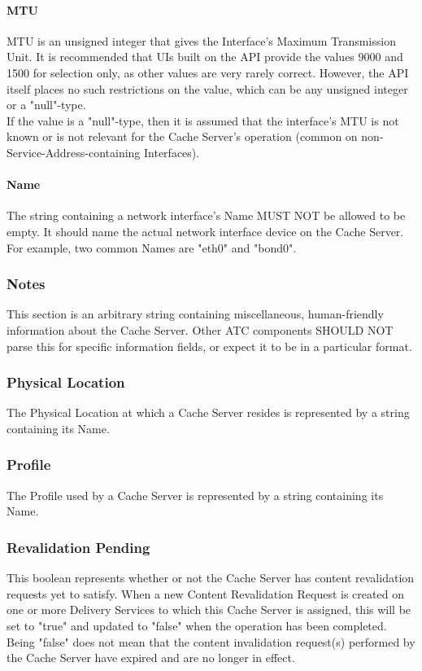 \paragraph{MTU}
MTU is an unsigned integer that gives the Interface's Maximum Transmission
Unit. It is recommended that UIs built on the API provide the values 9000
and 1500 for selection only, as other values are very rarely correct. However,
the API itself places no such restrictions on the value, which can be any
unsigned integer or a "null"-type.\\
If the value is a "null"-type, then it is assumed that the interface's MTU is
not known or is not relevant for the Cache Server's operation (common on
non-Service-Address-containing Interfaces).

\paragraph{Name}
The string containing a network interface's Name MUST NOT be allowed to be
empty. It should name the actual network interface device on the Cache Server.
For example, two common Names are "eth0" and "bond0".

\subsubsection{Notes}
This section is an arbitrary string containing miscellaneous, human-friendly
information about the Cache Server. Other ATC components SHOULD NOT parse this
for specific information fields, or expect it to be in a particular format.

\subsubsection{Physical Location}
The Physical Location at which a Cache Server resides is represented by a string
containing its Name.

\subsubsection{Profile}
The Profile used by a Cache Server is represented by a string containing its
Name.

\subsubsection{Revalidation Pending}
This boolean represents whether or not the Cache Server has content revalidation
requests yet to satisfy. When a new Content Revalidation Request is created on
one or more Delivery Services to which this Cache Server is assigned, this will
be set to "true" and updated to "false" when the operation has been completed.
Being "false" does not mean that the content invalidation request(s) performed
by the Cache Server have expired and are no longer in effect.


